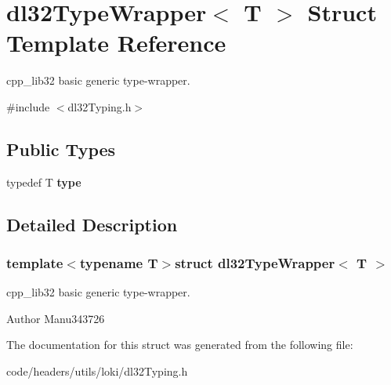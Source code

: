 \hypertarget{structdl32_type_wrapper}{\section{dl32\-Type\-Wrapper$<$ T $>$ Struct Template Reference}
\label{structdl32_type_wrapper}
}


cpp\-\_\-lib32 basic generic type-\/wrapper.  




{\ttfamily \#include $<$dl32\-Typing.\-h$>$}

\subsection*{Public Types}
\begin{DoxyCompactItemize}
\item 
\hypertarget{structdl32_type_wrapper_abadb3e17c6495b7fc39b898b7053c347}{typedef T {\bfseries type}}\label{structdl32_type_wrapper_abadb3e17c6495b7fc39b898b7053c347}

\end{DoxyCompactItemize}


\subsection{Detailed Description}
\subsubsection*{template$<$typename T$>$struct dl32\-Type\-Wrapper$<$ T $>$}

cpp\-\_\-lib32 basic generic type-\/wrapper. 

\begin{DoxyAuthor}{Author}
Manu343726 
\end{DoxyAuthor}


The documentation for this struct was generated from the following file\-:\begin{DoxyCompactItemize}
\item 
code/headers/utils/loki/dl32\-Typing.\-h\end{DoxyCompactItemize}
